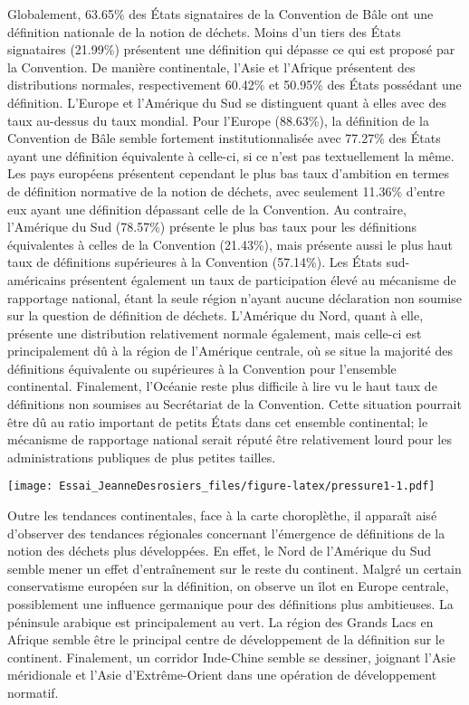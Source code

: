 \documentclass[12pt]{ulaval}
\begin{document}
Globalement, 63.65\% des États signataires de la Convention de Bâle ont une définition nationale de la notion de déchets. Moins d'un tiers des États signataires (21.99\%) présentent une définition qui dépasse ce qui est proposé par la Convention. De manière continentale, l'Asie et l'Afrique présentent des distributions normales, respectivement 60.42\% et 50.95\% des États possédant une définition. L'Europe et l'Amérique du Sud se distinguent quant à elles avec des taux au-dessus du taux mondial. Pour l'Europe (88.63\%), la définition de la Convention de Bâle semble fortement institutionnalisée avec 77.27\% des États ayant une définition équivalente à celle-ci, si ce n'est pas textuellement la même. Les pays européens présentent cependant le plus bas taux d'ambition en termes de définition normative de la notion de déchets, avec seulement 11.36\% d'entre eux ayant une définition dépassant celle de la Convention. Au contraire, l'Amérique du Sud (78.57\%) présente le plus bas taux pour les définitions équivalentes à celles de la Convention (21.43\%), mais présente aussi le plus haut taux de définitions supérieures à la Convention (57.14\%). Les États sud-américains présentent également un taux de participation élevé au mécanisme de rapportage national, étant la seule région n'ayant aucune déclaration non soumise sur la question de définition de déchets. L'Amérique du Nord, quant à elle, présente une distribution relativement normale également, mais celle-ci est principalement dû à la région de l'Amérique centrale, où se situe la majorité des définitions équivalente ou supérieures à la Convention pour l'ensemble continental. Finalement, l'Océanie reste plus difficile à lire vu le haut taux de définitions non soumises au Secrétariat de la Convention. Cette situation pourrait être dû au ratio important de petits États dans cet ensemble continental; le mécanisme de rapportage national serait réputé être relativement lourd pour les administrations publiques de plus petites tailles.

\texttt{[image: Essai\_JeanneDesrosiers\_files/figure-latex/pressure1-1.pdf]}

Outre les tendances continentales, face à la carte choroplèthe, il apparaît aisé d'observer des tendances régionales concernant l'émergence de définitions de la notion des déchets plus développées. En effet, le Nord de l'Amérique du Sud semble mener un effet d'entraînement sur le reste du continent. Malgré un certain conservatisme européen sur la définition, on observe un îlot en Europe centrale, possiblement une influence germanique pour des définitions plus ambitieuses. La péninsule arabique est principalement au vert. La région des Grands Lacs en Afrique semble être le principal centre de développement de la définition sur le continent. Finalement, un corridor Inde-Chine semble se dessiner, joignant l'Asie méridionale et l'Asie d'Extrême-Orient dans une opération de développement normatif.
\end{document}
